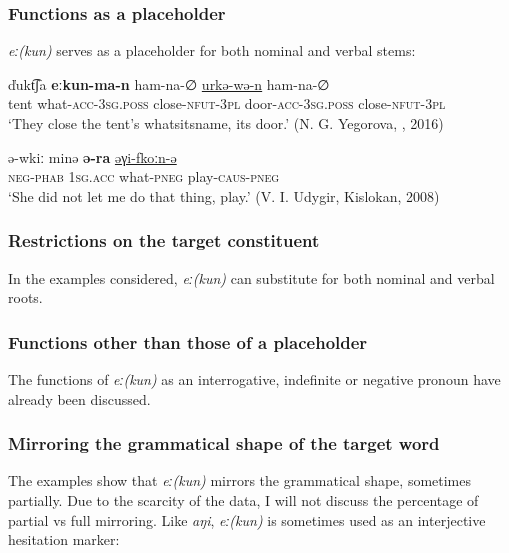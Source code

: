 \documentclass[output=paper,colorlinks,citecolor=brown]{langscibook}
\begin{document}
\subsubsection{Functions as a placeholder}

\textit{eː(kun)} serves as a placeholder for both nominal and verbal stems:

\ea
    \label{example6.44}
    \gll ďukt͡ʃa	\textbf{eːkun-ma-n}	ham-na-∅	\uline{urkə-wə-n}	ham-na-∅\\
    tent	what-\textsc{acc}-\textsc{3sg.poss}	close-\textsc{nfut}-3\textsc{pl}	door-\textsc{acc}-\textsc{3sg.poss}	close-\textsc{nfut}-3\textsc{pl}\\
    \glt `They close the tent’s whatsitsname, its door.' (N. G. Yegorova, , 2016)\\
    \z

\ea
    \label{example6.45}
    \gll ə-wkiː	minə	\textbf{ə-ra}	\uline{əγi-fkoːn-ə}\\
    \textsc{neg}-\textsc{phab}	1\textsc{sg}.\textsc{acc}	what-\textsc{pneg}	play-\textsc{caus}-\textsc{pneg}\\
    \glt `She did not let me do that thing, play.' (V. I. Udygir, Kislokan, 2008)\\
    \z

\subsubsection{Restrictions on the target constituent}

In the examples considered, \textit{eː(kun)} can substitute for both nominal and verbal roots.

\subsubsection{Functions other than those of a placeholder}

The functions of \textit{eː(kun)} as an interrogative, indefinite or negative pronoun have already been discussed.

\subsubsection{Mirroring the grammatical shape of the target word}

The examples show that \textit{eː(kun)} mirrors the grammatical shape, sometimes partially. Due to the scarcity of the data, I will not discuss the percentage of partial vs full mirroring.
Like \textit{aŋi}, \textit{eː(kun)} is sometimes used as an interjective hesitation marker:
\end{document}
